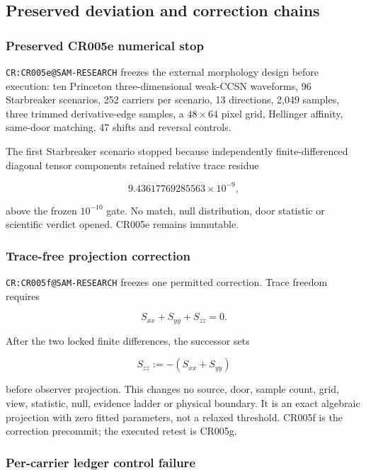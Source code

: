 \subsection{Preserved deviation and correction
chains}\label{viii-ch08-preserved-deviation-and-correction-chains}

\subsubsection{Preserved CR005e numerical
stop}\label{viii-ch08-preserved-cr005e-numerical-stop}

\texttt{CR:CR005e@SAM-RESEARCH} freezes the external morphology design
before execution: ten Princeton three-dimensional weak-CCSN waveforms,
96 Starbreaker scenarios, 252 carriers per scenario, 13 directions,
2,049 samples, three trimmed derivative-edge samples, a \(48\times64\)
pixel grid, Hellinger affinity, same-door matching, 47 shifts and
reversal controls.

The first Starbreaker scenario stopped because independently
finite-differenced diagonal tensor components retained relative trace
residue

\[
9.43617769285563\times10^{-9},
\]

above the frozen \(10^{-10}\) gate. No match, null distribution, door
statistic or scientific verdict opened. CR005e remains immutable.

\subsubsection{Trace-free projection
correction}\label{viii-ch08-trace-free-projection-correction}

\texttt{CR:CR005f@SAM-RESEARCH} freezes one permitted correction. Trace
freedom requires

\[
S_{xx}+S_{yy}+S_{zz}=0.
\]

After the two locked finite differences, the successor sets

\[
S_{zz}:=-(S_{xx}+S_{yy})
\]

before observer projection. This changes no source, door, sample count,
grid, view, statistic, null, evidence ladder or physical boundary. It is
an exact algebraic projection with zero fitted parameters, not a relaxed
threshold. CR005f is the correction precommit; the executed retest is
CR005g.

\subsubsection{Per-carrier ledger control
failure}\label{viii-ch08-per-carrier-ledger-control-failure}

